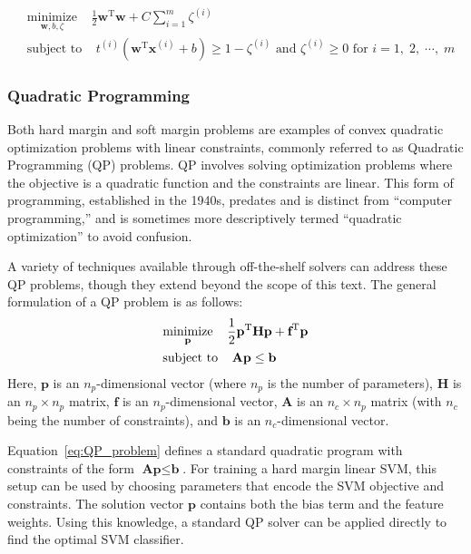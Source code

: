 \documentclass[12pt,letter]{article}
\begin{document}
\begin{equation}
\begin{split}
    & \underset{\textbf{w}, b, \zeta}{\text{minimize}} \;\;\;\; \frac{1}{2}\textbf{w}^\text{T}\textbf{w} + C \sum_{i=1}^{m} \zeta^{(i)} \\  
    & \text{subject to} \;\;\;\; t^{(i)}(\textbf{w}^\text{T}\textbf{x}^{(i)}+b ) \ge 1 - \zeta^{(i)} \text{ and } \zeta^{(i)} \ge 0 \text{ for } i=1, \; 2, \; \cdots,  \; m 
\end{split}
\end{equation}

\subsubsection{Quadratic Programming}
Both hard margin and soft margin problems are examples of convex quadratic optimization problems with linear constraints, commonly referred to as Quadratic Programming (QP) problems. QP involves solving optimization problems where the objective is a quadratic function and the constraints are linear. This form of programming, established in the 1940s, predates and is distinct from ``computer programming,'' and is sometimes more descriptively termed ``quadratic optimization'' to avoid confusion.

A variety of techniques available through off-the-shelf solvers can address these QP problems, though they extend beyond the scope of this text. The general formulation of a QP problem is as follows:
\begin{equation}
\begin{split}
    & \underset{\textbf{p}}{\text{minimize}} \;\;\;\; \frac{1}{2}\textbf{\textbf{p}}^\text{T}\textbf{H}\textbf{p} + \textbf{f}^\text{T}\textbf{p}\\
    & \text{subject to} \;\;\;\; \textbf{A} \textbf{p} \le \textbf{b}
\end{split}
\label{eq:QP_problem}
\end{equation}
Here, $\textbf{p}$ is an $n_p$-dimensional vector (where $n_p$ is the number of parameters), $\textbf{H}$ is an $n_p \times n_p$ matrix, $\textbf{f}$ is an $n_p$-dimensional vector, $\textbf{A}$ is an $n_c \times n_p$ matrix (with $n_c$ being the number of constraints), and $\textbf{b}$ is an $n_c$-dimensional vector. 

Equation~\ref{eq:QP_problem} defines a standard quadratic program with constraints of the form $\textbf{A} \textbf{p} \le \textbf{b}$. For training a hard margin linear SVM, this setup can be used by choosing parameters that encode the SVM objective and constraints. The solution vector $\textbf{p}$ contains both the bias term and the feature weights. Using this knowledge, a standard QP solver can be applied directly to find the optimal SVM classifier.
\end{document}
